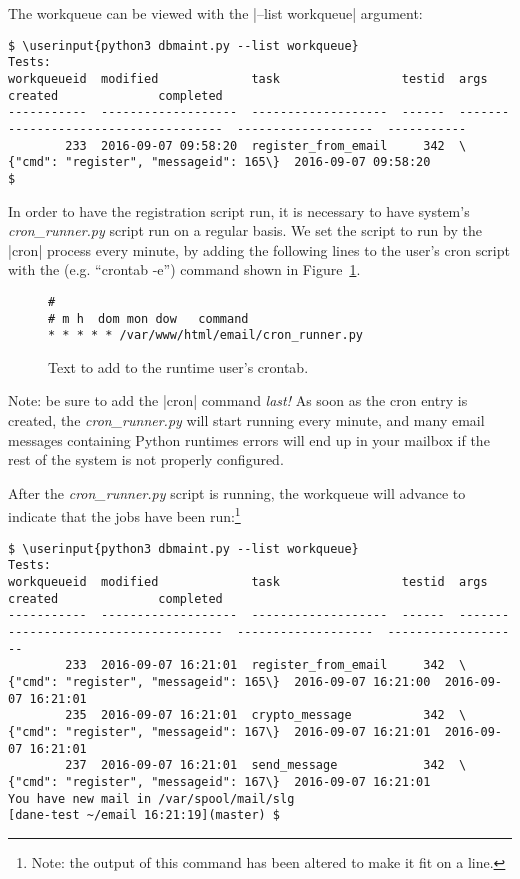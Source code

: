 \documentclass[preprint,3p,11pt]{elsarticle}
\newcommand\userinput[1]{\textbf{#1}}
\begin{document}
The workqueue can be viewed with the |--list workqueue| argument:

\begin{Verbatim}[commandchars=\\\{\},fontsize=\tiny]
$ \userinput{python3 dbmaint.py --list workqueue}
Tests:
workqueueid  modified             task                 testid  args                                   created              completed
-----------  -------------------  -------------------  ------  -------------------------------------  -------------------  -----------
        233  2016-09-07 09:58:20  register_from_email     342  \{"cmd": "register", "messageid": 165\}  2016-09-07 09:58:20
$
\end{Verbatim}


In order to have the registration script run, it is necessary to have
system's \emph{cron\_runner.py} script run on a regular basis. We set the
script to run by the |cron| process every minute, by adding the
following lines to the user's cron script with the (e.g. ``crontab
-e'') command shown in Figure~\ref{cron}.

\begin{figure}
\begin{Verbatim}[commandchars=\\\{\},fontsize=\small,frame=single]
#
# m h  dom mon dow   command
* * * * * /var/www/html/email/cron_runner.py
\end{Verbatim}
\caption{Text to add to the runtime user's crontab.}\label{cron}
\end{figure}

Note: be sure to add the |cron| command \emph{last!} As soon as the cron entry is created, the \emph{cron\_runner.py} will start running every minute, and many email messages containing Python runtimes errors will end up in your mailbox if the rest of the system is not properly configured.

After the \emph{cron\_runner.py} script is running, the workqueue will
advance to indicate that the jobs have been run:\footnote{Note: the
  output of this command has been altered to make it fit on a line.}

\begin{Verbatim}[commandchars=\\\{\},fontsize=\tiny]
$ \userinput{python3 dbmaint.py --list workqueue}
Tests:
workqueueid  modified             task                 testid  args                                   created              completed
-----------  -------------------  -------------------  ------  -------------------------------------  -------------------  -------------------
        233  2016-09-07 16:21:01  register_from_email     342  \{"cmd": "register", "messageid": 165\}  2016-09-07 16:21:00  2016-09-07 16:21:01
        235  2016-09-07 16:21:01  crypto_message          342  \{"cmd": "register", "messageid": 167\}  2016-09-07 16:21:01  2016-09-07 16:21:01
        237  2016-09-07 16:21:01  send_message            342  \{"cmd": "register", "messageid": 167\}  2016-09-07 16:21:01
You have new mail in /var/spool/mail/slg
[dane-test ~/email 16:21:19](master) $
\end{Verbatim}
\end{document}
